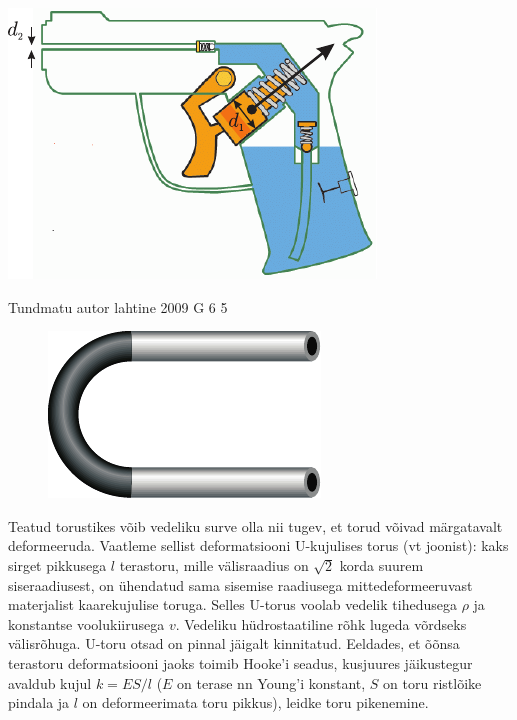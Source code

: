 \documentclass[11pt]{article}
\begin{document}
{{\begin{center}
	\includegraphics[width=0.6\linewidth]{2006-v3g-04-yl}
\end{center}
\fi
}

{Tundmatu autor} %
{lahtine} %
{2009} %
{G 6} %
{5} %
{
\ifStatement
\begin{figure}
	\begin{center}
		\vspace{-15pt}
		\includegraphics[width=\linewidth]{2009-lahg-06-yl}
	\end{center}
\end{figure}
Teatud torustikes võib vedeliku surve olla nii tugev, et torud võivad märgatavalt deformeeruda. Vaatleme sellist deformatsiooni U-kujulises torus (vt joonist): kaks sirget pikkusega $l$ terastoru, mille välisraadius on $\sqrt 2$ korda suurem siseraadiusest, on ühendatud sama sisemise raadiusega mittedeformeeruvast materjalist kaarekujulise toruga. Selles U-torus voolab vedelik tihedusega $\rho$ ja konstantse voolukiirusega $v$. Vedeliku hüdrostaatiline rõhk lugeda võrdseks välisrõhuga. U-toru otsad on pinnal jäigalt kinnitatud. Eeldades, et õõnsa terastoru deformatsiooni jaoks toimib Hooke’i seadus, kusjuures jäikustegur avaldub kujul $k = ES/l$ ($E$ on terase nn Young’i konstant, $S$ on toru ristlõike pindala ja $l$ on deformeerimata toru pikkus), leidke toru pikenemine.
\fi
}

}
\end{document}
